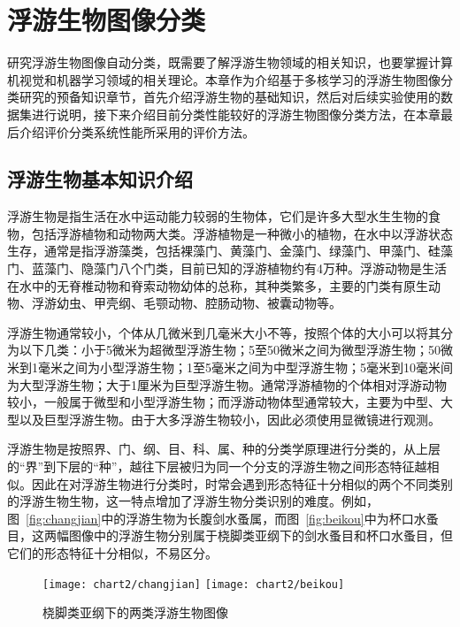 \chapter{浮游生物图像分类}

研究浮游生物图像自动分类，既需要了解浮游生物领域的相关知识，也要掌握计算机视觉和机器学习领域的相关理论。本章作为介绍基于多核学习的浮游生物图像分类研究的预备知识章节，首先介绍浮游生物的基础知识，然后对后续实验使用的数据集进行说明，接下来介绍目前分类性能较好的浮游生物图像分类方法，在本章最后介绍评价分类系统性能所采用的评价方法。

\section{浮游生物基本知识介绍}

浮游生物是指生活在水中运动能力较弱的生物体，它们是许多大型水生生物的食物，包括浮游植物和动物两大类。浮游植物是一种微小的植物，在水中以浮游状态生存，通常是指浮游藻类，包括裸藻门、黄藻门、金藻门、绿藻门、甲藻门、硅藻门、蓝藻门、隐藻门八个门类，目前已知的浮游植物约有4万种。浮游动物是生活在水中的无脊椎动物和脊索动物幼体的总称，其种类繁多，主要的门类有原生动物、浮游幼虫、甲壳纲、毛颚动物、腔肠动物、被囊动物等。

浮游生物通常较小，个体从几微米到几毫米大小不等，按照个体的大小可以将其分为以下几类：小于5微米为超微型浮游生物；5至50微米之间为微型浮游生物；50微米到1毫米之间为小型浮游生物；1至5毫米之间为中型浮游生物；5毫米到10毫米间为大型浮游生物；大于1厘米为巨型浮游生物。通常浮游植物的个体相对浮游动物较小，一般属于微型和小型浮游生物；而浮游动物体型通常较大，主要为中型、大型以及巨型浮游生物。由于大多浮游生物较小，因此必须使用显微镜进行观测。

浮游生物是按照界、门、纲、目、科、属、种的分类学原理进行分类的，从上层的“界”到下层的“种”，越往下层被归为同一个分支的浮游生物之间形态特征越相似。因此在对浮游生物进行分类时，时常会遇到形态特征十分相似的两个不同类别的浮游生物生物，这一特点增加了浮游生物分类识别的难度。例如，图~\ref{fig:changjian}中的浮游生物为长腹剑水蚤属，而图~\ref{fig:beikou}中为杯口水蚤目，这两幅图像中的浮游生物分别属于桡脚类亚纲下的剑水蚤目和杯口水蚤目，但它们的形态特征十分相似，不易区分。
\begin{figure}[h]
  \centering%
    {\texttt{[image: chart2/changjian]}}%
  \hspace{2em}%
      {\texttt{[image: chart2/beikou]}}\\
  \caption{桡脚类亚纲下的两类浮游生物图像}
  \label{fig:raojiao}
\end{figure}


